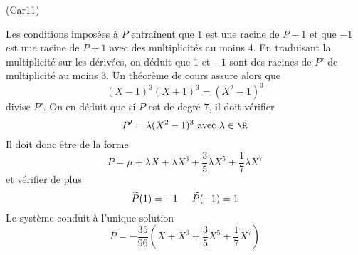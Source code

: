 \begin{tiny}(Car11)\end{tiny} Les conditions imposées à $P$ entraînent que $1$ est une racine de $P -1$ et que $-1$ est une racine de $P+1$ avec des multiplicités au moins $4$. En traduisant la multiplicité sur les dérivées, on déduit que $1$ et $-1$ sont des racines de $P'$ de multiplicité au moins $3$. Un théorème de cours assure alors que 
\begin{displaymath}
 (X-1)^3(X+1)^3 = (X^2-1)^3
\end{displaymath}
divise $P'$. On en déduit que si $P$ est de degré $7$, il doit vérifier
\begin{displaymath}
 P' = \lambda (X^2-1)^3 \text{ avec } \lambda\in \R
\end{displaymath}
Il doit donc être de la forme
\begin{displaymath}
 P = \mu + \lambda X +\lambda X^3 +\frac{3}{5}\lambda X^5 + \frac{1}{7}\lambda X^7
\end{displaymath}
et vérifier de plus 
\begin{displaymath}
 \widetilde{P}(1) = -1 \hspace{0.5cm} \widetilde{P}(-1) = 1  
\end{displaymath}
Le système conduit à l'unique solution
\begin{displaymath}
 P = -\frac{35}{96}\left( X + X^3 +\frac{3}{5} X^5 + \frac{1}{7} X^7\right) 
\end{displaymath}
